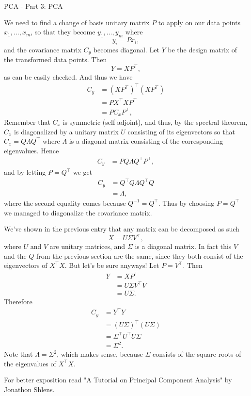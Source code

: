 \begin{entry}[4]{PCA - Part 3: PCA}
\begin{entrysection} 
We need to find a change of basis unitary matrix $P$ to apply on our data points $x_1, \ldots, x_m$, so that they become $y_1,\ldots,y_m$ where
\[ y_i = Px_i, \]
and the covariance matrix $C_y$ becomes diagonal. Let $Y$ be the design matrix of the transformed data points. Then
\[ Y = XP^{\top}, \]
as can be easily checked. And thus we have
\begin{align*}
C_y &= (XP^{\top})^{\top} (XP^{\top}) \\
&= PX^{\top}XP^{\top} \\
&= PC_xP^{\top},
\end{align*}
Remember that $C_x$ is symmetric (self-adjoint), and thus, by the spectral theorem, $C_x$ is diagonalized by a unitary matrix $U$ consisting of its eigenvectors so that $C_x = Q \Lambda Q^{\top}$ where $\Lambda$ is a diagonal matrix consisting of the corresponding eigenvalues. Hence
\begin{align*}
C_y &= PQ\Lambda Q^{\top}P^{\top},
\end{align*}
and by letting $P = Q^{\top}$ we get
\begin{align*}
    C_y &= Q^{\top}Q \Lambda Q^{\top}Q \\
    &= \Lambda,
\end{align*}
where the second equality comes because $Q^{-1} = Q^{\top}$. Thus by choosing $P = Q^{\top}$ we managed to diagonalize the covariance matrix.
\end{entrysection}

\begin{entrysection} 
We've shown in the previous entry that any matrix can be decomposed as such
\[ X = U \Sigma V^{\top}, \]
where $U$ and $V$ are unitary matrices, and $\Sigma$ is a diagonal matrix. In fact this $V$ and the $Q$ from the previous section are the same, since they both consist of the eigenvectors of $X^{\top}X$. But let's be sure anyways! Let $P = V^{\top}$. Then 
\begin{align*}
    Y &= XP^{\top} \\
    &= U \Sigma V^{\top} V\\
    &= U \Sigma.
\end{align*}
Therefore
\begin{align*}
    C_y &= Y^{\top}Y \\ 
    &= (U \Sigma)^{\top}(U \Sigma)\\
    &= \Sigma^{\top} U^{\top} U \Sigma \\
    &= \Sigma^2.
\end{align*}
Note that $\Lambda = \Sigma^2$, which makes sense, because $\Sigma$ consists of the square roots of the eigenvalues of $X^{\top}X$.
\end{entrysection}

\begin{entrysection}
For better exposition read "A Tutorial on Principal Component Analysis" by Jonathon Shlens.
\end{entrysection}

\end{entry}